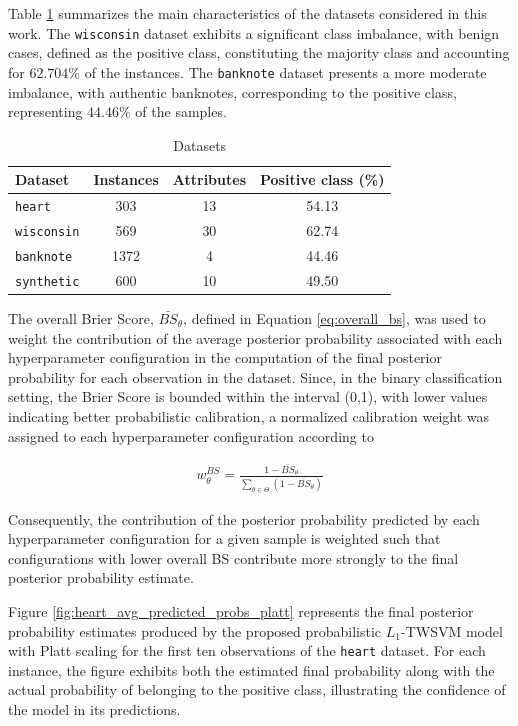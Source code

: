 \documentclass[12pt]{report} %
\begin{document}
\newpage

Table \ref{tab:datasets_summary} summarizes the main characteristics of the datasets considered in this work. The \texttt{wisconsin} dataset exhibits a significant class imbalance, with benign cases, defined as the positive class, constituting the majority class and accounting for $62.704\%$  of the instances. The \texttt{banknote} dataset presents a more moderate imbalance, with authentic banknotes, corresponding to the positive class, representing $44.46\%$ of the samples.

\begin{table}[H]
\centering
\caption{Datasets}
\label{tab:datasets_summary}
\begin{tabular}{lccc}
\hline
\textbf{Dataset} & \textbf{Instances} & \textbf{Attributes} & \textbf{Positive class (\%)} \\
\hline
\texttt{heart} & 303 & 13 & 54.13 \\
\texttt{wisconsin} & 569 & 30 & 62.74 \\
\texttt{banknote} & 1372 & 4 & 44.46 \\
\texttt{synthetic} & 600 & 10 & 49.50 \\
\hline
\end{tabular}
\end{table}

The overall Brier Score, $\bar{BS}_\theta$, defined in Equation \ref{eq:overall_bs}, was used to weight the contribution of the average posterior probability associated with each hyperparameter configuration in the computation of the final posterior probability for each observation in the dataset. Since, in the binary classification setting, the Brier Score is bounded within the interval (0,1), with lower values indicating better probabilistic calibration, a normalized calibration weight was assigned to each hyperparameter configuration according to

\begin{align}
\label{eq:normalized_calibration_weight}
w_{\theta}^{BS} = \frac{1-\bar{BS}_\theta}{\sum_{\theta \in \Theta} (1-\bar{BS}_\theta)}
\end{align}

Consequently, the contribution of the posterior probability predicted by each hyperparameter configuration for a given sample is weighted such that configurations with lower overall BS contribute more strongly to the final posterior probability estimate.

Figure \ref{fig:heart_avg_predicted_probs_platt} represents the final posterior probability estimates produced by the proposed probabilistic $L_1$-TWSVM model with Platt scaling for the first ten observations of the \texttt{heart} dataset. For each instance, the figure exhibits both the estimated final probability along with the actual probability of belonging to the positive class, illustrating the confidence of the model in its predictions.
\end{document}
